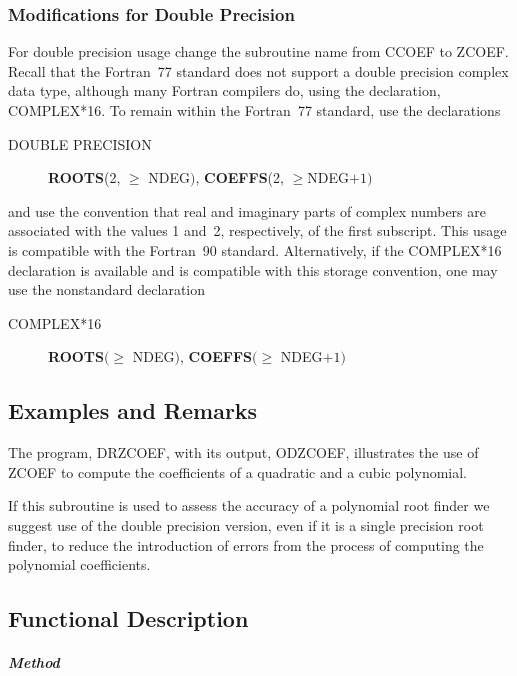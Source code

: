\documentclass[twoside]{MATH77}
\begin{document}
\subsubsection{Modifications for Double Precision}

For double precision usage change the subroutine name from CCOEF to ZCOEF.
Recall that the Fortran~77 standard does not support a double precision
complex data type, although many Fortran compilers do, using the
declaration, COMPLEX*16. To remain within the Fortran~77 standard, use the
declarations
\begin{description}
\item[DOUBLE PRECISION]  {\bf ROOTS}(2, $\geq $ NDEG$)$,
{\bf COEFFS}(2, $\geq $NDEG$+1)$
\end{description}

and use the convention that real and imaginary parts of complex numbers are
associated with the values 1 and~2, respectively, of the first subscript.
This usage is compatible with the Fortran~90 standard.  Alternatively, if
the COMPLEX*16 declaration is available and is compatible with this storage
convention, one may use the nonstandard declaration
\begin{description}
\item[COMPLEX*16]  {\bf ROOTS}$(\geq $ NDEG$)$,
{\bf COEFFS}$(\geq $ NDEG$+1)$
\end{description}

\subsection{Examples and Remarks}

The program, DRZCOEF, with its output, ODZCOEF, illustrates the use of ZCOEF
to compute the coefficients of a quadratic and a cubic polynomial.

If this subroutine is used to assess the accuracy of a polynomial root
finder we suggest use of the double precision version, even if it is a single precision
root finder, to reduce the introduction of errors from the process of
computing the polynomial coefficients.

\subsection{Functional Description}

\subparagraph{Method}
\end{document}
